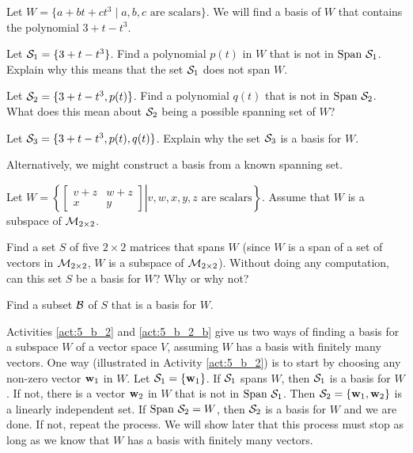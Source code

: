 \begin{activity} \label{act:5_b_2} Let $W = \{a + bt + ct^3 \mid a, b, c \text{ are scalars}\}$. We will find a basis of $W$ that contains the polynomial $3+t-t^3$. 
	\ba	
	\item Let $\mathcal{S}_1 = \{3+t-t^3\}$. Find a polynomial $p(t)$ in $W$ that is not in $\text{Span} \ \mathcal{S}_1$. Explain why this means that the set $\mathcal{S}_1$ does not span $W$.
	
	\item  Let $\mathcal{S}_2 = \{3+t-t^3, p(t)\}$. Find a polynomial $q(t)$ that is not in $\text{Span} \ \mathcal{S}_2$. What does this mean about $\mathcal{S}_2$ being a possible spanning set of $W$? 
		
	\item  Let $\mathcal{S}_3 = \{3+t-t^3, p(t), q(t)\}$. Explain why the set $\mathcal{S}_3$ is a basis for $W$. 

	\ea

\end{activity}

Alternatively, we might construct a basis from a known spanning set.

\begin{activity}  \label{act:5_b_2_b}  Let $W = \left\{\left[ \begin{array}{cc} v+z&w+z \\ x&y \end{array} \right] \left. \right| v, w, x, y, z \text{ are scalars}\right\}$. Assume that $W$ is a subspace of $\mathcal{M}_{2 \times 2}$. 
	\ba
	\item Find a set $S$ of five $2 \times 2$ matrices that spans $W$ (since $W$ is a span of a set of vectors in $\mathcal{M}_{2 \times 2}$, $W$ is a subspace of $\mathcal{M}_{2 \times 2}$). Without doing any computation, can this set $S$ be a basis for $W$? Why or why not?
	
	
	
	\item Find a subset $\mathcal{B}$ of $S$ that is a basis for $W$.

	\ea
	
\end{activity}



Activities \ref{act:5_b_2} and \ref{act:5_b_2_b} give us two ways of finding a basis for a subspace $W$ of a vector space $V$, assuming $W$ has a basis with finitely many vectors. One way (illustrated in Activity \ref{act:5_b_2})  is to start by choosing any non-zero vector $\mathbf{w}_1$ in $W$. Let $\mathcal{S}_1 = \{\mathbf{w}_1\}$. If $\mathcal{S}_1$ spans $W$, then $\mathcal{S}_1$ is a basis for $W$. If not, there is a vector $\mathbf{w}_2$ in $W$ that is not in $\text{Span} \ \mathcal{S}_1$. Then $\mathcal{S}_2 = \{\mathbf{w}_1, \mathbf{w}_2\}$ is a linearly independent set. If $\text{Span} \ \mathcal{S}_2 = W$, then $\mathcal{S}_2$ is a basis for $W$ and we are done. If not, repeat the process. We will show later that this process must stop as long as we know that $W$ has a basis with finitely many vectors. 

